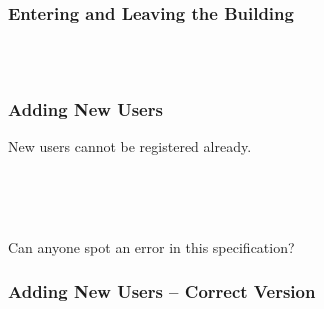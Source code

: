 \documentclass{beamer}
\begin{document}
\begin{frame}

\frametitle{Entering and Leaving the Building}
~\\

\events

\begin{columns}
\begin{column}{2in}
\end{column}
\begin{column}{2in}
\end{column}
\end{columns}


\end{frame}





\begin{frame}

\frametitle{Adding New Users}

New users cannot be registered already.

~


~

\pause
Can anyone spot an error in this specification?


\end{frame}



\begin{frame}

\frametitle{Adding New Users -- Correct Version}




\end{frame}
\end{document}
